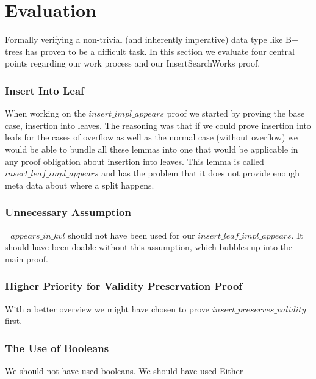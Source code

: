 \section{Evaluation}
\label{sec:Evaluation}
Formally verifying a non-trivial (and inherently imperative) data type like B+ trees has proven to be a difficult task. In this section we evaluate four central points regarding our work process and our InsertSearchWorks proof.
\subsubsection{Insert Into Leaf}
When working on the $insert\_impl\_appears$ proof we started by proving the base case, insertion into leaves. The reasoning was that if we could prove insertion into leafs for the cases of overflow as well as the normal case (without overflow) we would be able to bundle all these lemmas into one that would be applicable in any proof obligation about insertion into leaves. This lemma is called $insert\_leaf\_impl\_appears$ and has the problem that it does not provide enough meta data about where a split happens.
\subsubsection{Unnecessary Assumption}
$\lnot appears\_in\_kvl$ should not have been used for our $insert\_leaf\_impl\_appears$. It should have been doable without this assumption, which bubbles up into the main proof.
\subsubsection{Higher Priority for Validity Preservation Proof}
With a better overview we might have chosen to prove $insert\_preserves\_validity$ first.
\subsubsection{The Use of Booleans}
We should not have used booleans. We should have used Either